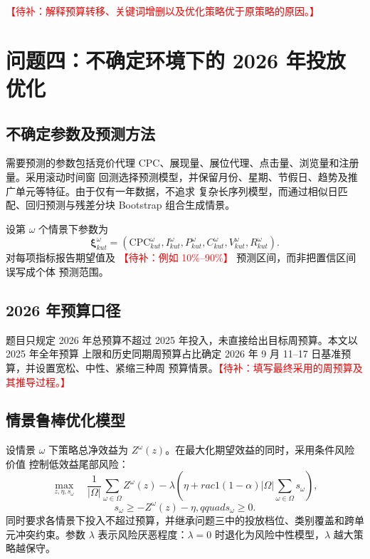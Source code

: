 \documentclass[UTF8,a4paper,zihao=-4]{ctexart}
\newcommand{\placeholder}[1]{\textcolor{red}{【待补：#1】}}
\begin{document}
\placeholder{解释预算转移、关键词增删以及优化策略优于原策略的原因。}

\section{问题四：不确定环境下的 2026 年投放优化}

\subsection{不确定参数及预测方法}

需要预测的参数包括竞价代理 CPC、展现量、展位代理、点击量、浏览量和注册量。采用滚动时间窗
回测选择预测模型，并保留月份、星期、节假日、趋势及推广单元等特征。由于仅有一年数据，不追求
复杂长序列模型，而通过相似日匹配、回归预测与残差分块 Bootstrap 组合生成情景\cite{bootstrap}。

设第 $\omega$ 个情景下参数为
\begin{equation}
  \boldsymbol\xi^{\omega}_{kut}=
  \left(\mathrm{CPC}^{\omega}_{kut},I^{\omega}_{kut},P^{\omega}_{kut},
  C^{\omega}_{kut},V^{\omega}_{kut},R^{\omega}_{kut}\right).
\end{equation}
对每项指标报告期望值及 \placeholder{例如 10\%--90\%} 预测区间，而非把置信区间误写成个体
预测范围。

\subsection{2026 年预算口径}

题目只规定 2026 年总预算不超过 2025 年投入，未直接给出目标周预算。本文以 2025 年全年预算
上限和历史同期周预算占比确定 2026 年 9 月 11--17 日基准预算，并设置宽松、中性、紧缩三种周
预算情景。\placeholder{填写最终采用的周预算及其推导过程。}

\subsection{情景鲁棒优化模型}

设情景 $\omega$ 下策略总净效益为 $Z^{\omega}(z)$。在最大化期望效益的同时，采用条件风险价值
控制低效益尾部风险\cite{cvar}：
\begin{equation}
  \max_{z,\eta,s_{\omega}}
  \quad \frac{1}{|\Omega|}\sum_{\omega\in\Omega}Z^{\omega}(z)
  -\lambda\left(\eta+rac{1}{(1-\alpha)|\Omega|}
  \sum_{\omega\in\Omega}s_{\omega}\right),
\end{equation}
\begin{equation}
  s_{\omega}\geq -Z^{\omega}(z)-\eta,qquad
  s_{\omega}\geq0.
\end{equation}
同时要求各情景下投入不超过预算，并继承问题三中的投放档位、类别覆盖和跨单元冲突约束。参数
$\lambda$ 表示风险厌恶程度：$\lambda=0$ 时退化为风险中性模型，$\lambda$ 越大策略越保守。
\end{document}
